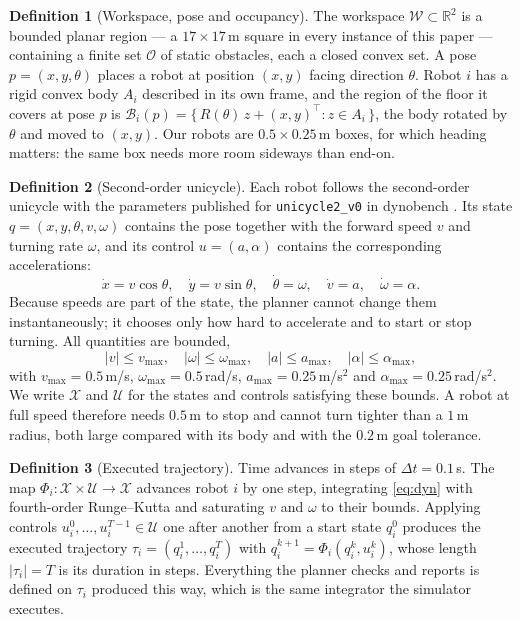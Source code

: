 \documentclass[conference]{IEEEtran}
\theoremstyle{plain}
\theoremstyle{definition}
\newtheorem{definition}{Definition}
\newcommand{\R}{\mathbb{R}}
\newcommand{\W}{\mathcal{W}}
\newcommand{\Obs}{\mathcal{O}}
\newcommand{\Bod}{\mathcal{B}}
\newcommand{\X}{\mathcal{X}}
\newcommand{\Uc}{\mathcal{U}}
\begin{document}
\begin{definition}[Workspace, pose and occupancy]
The workspace $\W \subset \R^2$ is a bounded planar region --- a $17 \times 17$\,m square in
every instance of this paper --- containing a finite set $\Obs$ of static obstacles, each a
closed convex set. A pose $p = (x,y,\theta)$ places a robot at position $(x,y)$ facing
direction $\theta$. Robot $i$ has a rigid convex body $A_i$ described in its own frame, and
the region of the floor it covers at pose $p$ is
$\Bod_i(p) = \{\, R(\theta)\,z + (x,y)^{\!\top} : z \in A_i \,\}$, the body rotated by
$\theta$ and moved to $(x,y)$. Our robots are $0.5 \times 0.25$\,m boxes, for which heading
matters: the same box needs more room sideways than end-on.
\end{definition}

\begin{definition}[Second-order unicycle]
\label{def:robot}
Each robot follows the second-order unicycle with the parameters published for
\texttt{unicycle2\_v0} in dynobench \cite{dynobench}. Its state $q = (x,y,\theta,v,\omega)$
contains the pose together with the forward speed $v$ and turning rate $\omega$, and its
control $u = (a,\alpha)$ contains the corresponding accelerations:
\begin{equation}
  \dot x = v\cos\theta,\quad
  \dot y = v\sin\theta,\quad
  \dot\theta = \omega,\quad
  \dot v = a,\quad
  \dot\omega = \alpha .
  \label{eq:dyn}
\end{equation}
Because speeds are part of the state, the planner cannot change them instantaneously; it
chooses only how hard to accelerate and to start or stop turning. All quantities are bounded,
\begin{equation}
  |v| \le v_{\max},\quad |\omega| \le \omega_{\max},\quad
  |a| \le a_{\max},\quad |\alpha| \le \alpha_{\max},
  \label{eq:bounds}
\end{equation}
with $v_{\max}=0.5$\,m/s, $\omega_{\max}=0.5$\,rad/s, $a_{\max}=0.25$\,m/s$^2$ and
$\alpha_{\max}=0.25$\,rad/s$^2$. We write $\X$ and $\Uc$ for the states and controls
satisfying these bounds. A robot at full speed therefore needs $0.5$\,m to stop and cannot
turn tighter than a $1$\,m radius, both large compared with its body and with the $0.2$\,m
goal tolerance.
\end{definition}

\begin{definition}[Executed trajectory]
\label{def:exec}
Time advances in steps of $\Delta t = 0.1$\,s. The map $\Phi_i : \X \times \Uc \to \X$
advances robot $i$ by one step, integrating \eqref{eq:dyn} with fourth-order Runge--Kutta and
saturating $v$ and $\omega$ to their bounds. Applying controls
$u_i^0,\dots,u_i^{T-1} \in \Uc$ one after another from a start state $q_i^0$ produces the
executed trajectory $\tau_i = (q_i^1,\dots,q_i^T)$ with $q_i^{k+1} = \Phi_i(q_i^k,u_i^k)$,
whose length $|\tau_i| = T$ is its duration in steps. Everything the planner checks and
reports is defined on $\tau_i$ produced this way, which is the same integrator the simulator
executes.
\end{definition}
\end{document}
